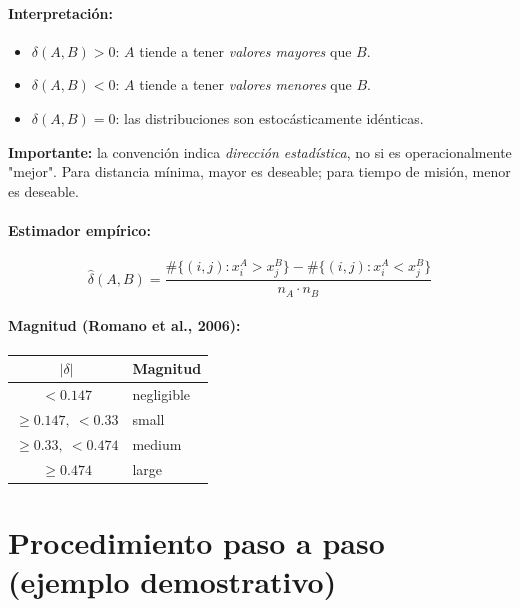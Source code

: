 \documentclass[12pt,a4paper,oneside]{book}
\begin{document}
\paragraph{Interpretación:}
\begin{itemize}
    \item $\delta(A,B) > 0$: $A$ tiende a tener \emph{valores mayores} que $B$.
    \item $\delta(A,B) < 0$: $A$ tiende a tener \emph{valores menores} que $B$.
    \item $\delta(A,B) = 0$: las distribuciones son estocásticamente idénticas.
\end{itemize}

\textbf{Importante:} la convención indica \emph{dirección estadística}, no si es operacionalmente "mejor". Para distancia mínima, mayor es deseable; para tiempo de misión, menor es deseable.

\paragraph{Estimador empírico:}
\begin{equation}
\hat{\delta}(A,B) = \frac{\#\{(i,j) : x_i^A > x_j^B\} - \#\{(i,j) : x_i^A < x_j^B\}}{n_A \cdot n_B}
\end{equation}

\paragraph{Magnitud (Romano et al., 2006):}
\begin{table}[H]
\centering
\begin{tabular}{cl}
\toprule
$|\delta|$ & Magnitud \\
\midrule
$< 0.147$ & negligible \\
$\geq 0.147,\ <0.33$ & small \\
$\geq 0.33,\ <0.474$ & medium \\
$\geq 0.474$ & large \\
\bottomrule
\end{tabular}
\end{table}

\newpage
\section{Procedimiento paso a paso (ejemplo demostrativo)}
\end{document}
